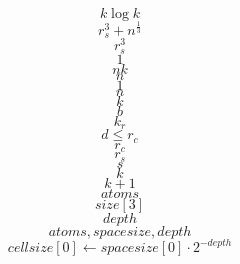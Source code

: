 \documentclass{scrreprt}
\begin{document}
\begin{equation}
k\log{k}
\end{equation}
\begin{equation}
r_s^3+n^\frac{1}{3}
\end{equation}
\begin{equation}
r_s^3
\end{equation}
\begin{equation}
1
\end{equation}
\begin{equation}
nk
\end{equation}
\begin{equation}
n
\end{equation}
\begin{equation}
1
\end{equation}
\begin{equation}
n
\end{equation}
\begin{equation}
k
\end{equation}
\begin{equation}
b
\end{equation}
\begin{equation}
k_r
\end{equation}
\begin{equation}
d \leq r_c
\end{equation}
\begin{equation}
r_c
\end{equation}
\begin{equation}
r_s
\end{equation}
\begin{equation}
s
\end{equation}
\begin{equation}
k
\end{equation}
\begin{equation}
k+1
\end{equation}
\begin{equation}
atoms
\end{equation}
\begin{equation}
size[3]
\end{equation}
\begin{equation}
depth
\end{equation}
\begin{equation}
atoms, spacesize, depth
\end{equation}
\begin{equation}
cellsize[0] \gets spacesize[0]\cdot2^{-depth}
\end{equation}
\end{document}
